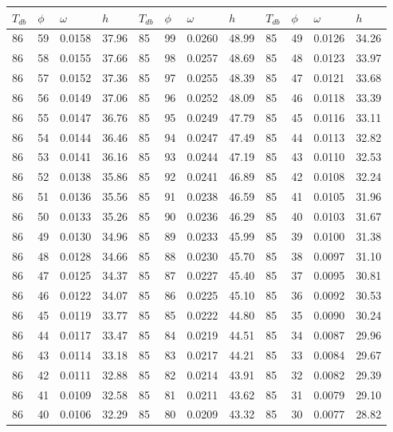 \begin{tabular}{llll|llll|llll}
 \toprule 
\(T_{db}\) & \(\phi\) & \(\omega\) & \(h\) & \(T_{db}\) & \(\phi\) & \(\omega\) & \(h\) & \(T_{db}\) & \(\phi\) & \(\omega\) & \(h\)  \\ \midrule 
86 & 59 & 0.0158 & 37.96 & 85 & 99 & 0.0260 & 48.99 & 85 & 49 & 0.0126 & 34.26\\
86 & 58 & 0.0155 & 37.66 & 85 & 98 & 0.0257 & 48.69 & 85 & 48 & 0.0123 & 33.97\\
86 & 57 & 0.0152 & 37.36 & 85 & 97 & 0.0255 & 48.39 & 85 & 47 & 0.0121 & 33.68\\
86 & 56 & 0.0149 & 37.06 & 85 & 96 & 0.0252 & 48.09 & 85 & 46 & 0.0118 & 33.39\\
86 & 55 & 0.0147 & 36.76 & 85 & 95 & 0.0249 & 47.79 & 85 & 45 & 0.0116 & 33.11\\
86 & 54 & 0.0144 & 36.46 & 85 & 94 & 0.0247 & 47.49 & 85 & 44 & 0.0113 & 32.82\\
86 & 53 & 0.0141 & 36.16 & 85 & 93 & 0.0244 & 47.19 & 85 & 43 & 0.0110 & 32.53\\
86 & 52 & 0.0138 & 35.86 & 85 & 92 & 0.0241 & 46.89 & 85 & 42 & 0.0108 & 32.24\\
86 & 51 & 0.0136 & 35.56 & 85 & 91 & 0.0238 & 46.59 & 85 & 41 & 0.0105 & 31.96\\
86 & 50 & 0.0133 & 35.26 & 85 & 90 & 0.0236 & 46.29 & 85 & 40 & 0.0103 & 31.67\\
86 & 49 & 0.0130 & 34.96 & 85 & 89 & 0.0233 & 45.99 & 85 & 39 & 0.0100 & 31.38\\
86 & 48 & 0.0128 & 34.66 & 85 & 88 & 0.0230 & 45.70 & 85 & 38 & 0.0097 & 31.10\\
86 & 47 & 0.0125 & 34.37 & 85 & 87 & 0.0227 & 45.40 & 85 & 37 & 0.0095 & 30.81\\
86 & 46 & 0.0122 & 34.07 & 85 & 86 & 0.0225 & 45.10 & 85 & 36 & 0.0092 & 30.53\\
86 & 45 & 0.0119 & 33.77 & 85 & 85 & 0.0222 & 44.80 & 85 & 35 & 0.0090 & 30.24\\
86 & 44 & 0.0117 & 33.47 & 85 & 84 & 0.0219 & 44.51 & 85 & 34 & 0.0087 & 29.96\\
86 & 43 & 0.0114 & 33.18 & 85 & 83 & 0.0217 & 44.21 & 85 & 33 & 0.0084 & 29.67\\
86 & 42 & 0.0111 & 32.88 & 85 & 82 & 0.0214 & 43.91 & 85 & 32 & 0.0082 & 29.39\\
86 & 41 & 0.0109 & 32.58 & 85 & 81 & 0.0211 & 43.62 & 85 & 31 & 0.0079 & 29.10\\
86 & 40 & 0.0106 & 32.29 & 85 & 80 & 0.0209 & 43.32 & 85 & 30 & 0.0077 & 28.82\\

\end{tabular}
